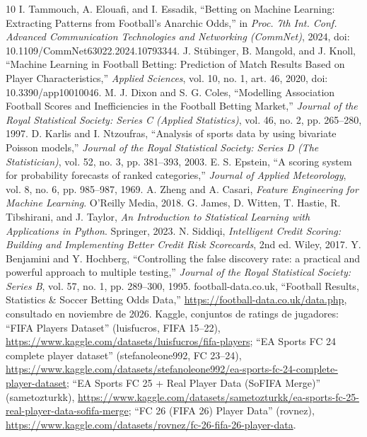 \begin{thebibliography}{10}
 I. Tammouch, A. Elouafi, and I. Essadik, ``Betting on Machine Learning: Extracting Patterns from Football's Anarchic Odds,'' in \textit{Proc. 7th Int. Conf. Advanced Communication Technologies and Networking (CommNet)}, 2024, doi: 10.1109/CommNet63022.2024.10793344.
 J. Stübinger, B. Mangold, and J. Knoll, ``Machine Learning in Football Betting: Prediction of Match Results Based on Player Characteristics,'' \textit{Applied Sciences}, vol. 10, no. 1, art. 46, 2020, doi: 10.3390/app10010046.
 M. J. Dixon and S. G. Coles, ``Modelling Association Football Scores and Inefficiencies in the Football Betting Market,'' \textit{Journal of the Royal Statistical Society: Series C (Applied Statistics)}, vol. 46, no. 2, pp. 265--280, 1997.
 D. Karlis and I. Ntzoufras, ``Analysis of sports data by using bivariate Poisson models,'' \textit{Journal of the Royal Statistical Society: Series D (The Statistician)}, vol. 52, no. 3, pp. 381--393, 2003.
 E. S. Epstein, ``A scoring system for probability forecasts of ranked categories,'' \textit{Journal of Applied Meteorology}, vol. 8, no. 6, pp. 985--987, 1969.
 A. Zheng and A. Casari, \textit{Feature Engineering for Machine Learning}. O'Reilly Media, 2018.
 G. James, D. Witten, T. Hastie, R. Tibshirani, and J. Taylor, \textit{An Introduction to Statistical Learning with Applications in Python}. Springer, 2023.
 N. Siddiqi, \textit{Intelligent Credit Scoring: Building and Implementing Better Credit Risk Scorecards}, 2nd ed. Wiley, 2017.
 Y. Benjamini and Y. Hochberg, ``Controlling the false discovery rate: a practical and powerful approach to multiple testing,'' \textit{Journal of the Royal Statistical Society: Series B}, vol. 57, no. 1, pp. 289--300, 1995.
 football-data.co.uk, ``Football Results, Statistics \& Soccer Betting Odds Data,'' \url{https://football-data.co.uk/data.php}, consultado en noviembre de 2026.
 Kaggle, conjuntos de ratings de jugadores: ``FIFA Players Dataset'' (luisfucros, FIFA 15--22), \url{https://www.kaggle.com/datasets/luisfucros/fifa-players}; ``EA Sports FC 24 complete player dataset'' (stefanoleone992, FC 23--24), \url{https://www.kaggle.com/datasets/stefanoleone992/ea-sports-fc-24-complete-player-dataset}; ``EA Sports FC 25 + Real Player Data (SoFIFA Merge)'' (sametozturkk), \url{https://www.kaggle.com/datasets/sametozturkk/ea-sports-fc-25-real-player-data-sofifa-merge}; ``FC 26 (FIFA 26) Player Data'' (rovnez), \url{https://www.kaggle.com/datasets/rovnez/fc-26-fifa-26-player-data}.
\end{thebibliography}


